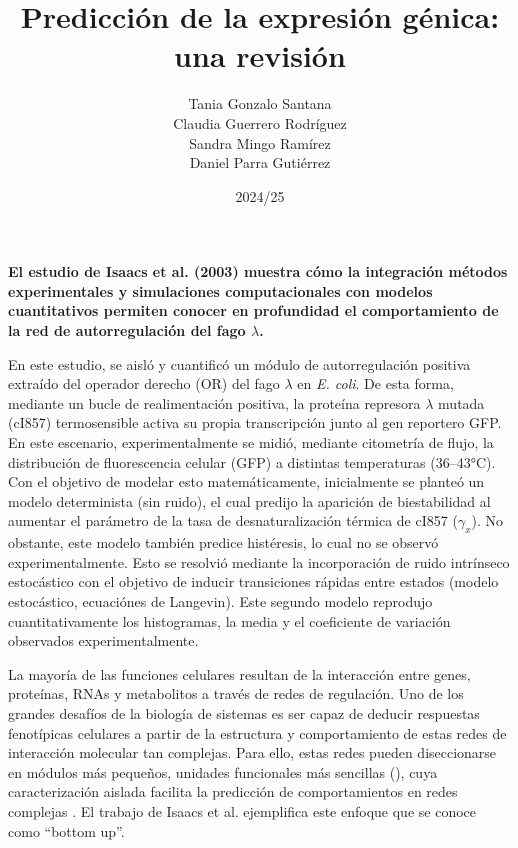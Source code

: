 \documentclass[nochap]{config/ejercicios}
\title{Predicción de la expresión génica: una revisión}
\author{Tania Gonzalo Santana \\ Claudia Guerrero Rodríguez \\ Sandra Mingo Ramírez \\ Daniel Parra Gutiérrez }
\date{2024/25}
\begin{document}
\maketitle

\large
\textbf{El estudio de Isaacs et al. (2003) muestra cómo la integración métodos experimentales y simulaciones computacionales con modelos cuantitativos permiten conocer en profundidad el comportamiento de la red de autorregulación del fago $\lambda$.}
\normalsize

En este estudio, se aisló y cuantificó un módulo de autorregulación positiva extraído del operador derecho (OR) del fago $\lambda$ en \textit{E. coli}. De esta forma, mediante un bucle de realimentación positiva, la proteína represora $\lambda$ mutada (cI857) termosensible activa su propia transcripción junto al gen reportero GFP. En este escenario, experimentalmente se midió, mediante citometría de flujo, la distribución de fluorescencia celular (GFP) a distintas temperaturas (36–43°C). Con el objetivo de modelar esto matemáticamente, inicialmente se planteó un modelo determinista (sin ruido), el cual predijo la aparición de biestabilidad al aumentar el parámetro de la tasa de desnaturalización térmica de cI857 ($\gamma_x$). No obstante, este modelo también predice histéresis, lo cual no se observó experimentalmente. Esto se resolvió mediante la incorporación de ruido intrínseco estocástico con el objetivo de inducir transiciones rápidas entre estados (modelo estocástico, ecuaciónes de Langevin). Este segundo modelo reprodujo cuantitativamente los histogramas, la media y el coeficiente de variación observados experimentalmente.

La mayoría de las funciones celulares resultan de la interacción entre genes, proteínas, RNAs y metabolitos a través de redes de regulación. Uno de los grandes desafíos de la biología de sistemas es ser capaz de deducir respuestas fenotípicas celulares a partir de la estructura y comportamiento de estas redes de interacción molecular tan complejas. Para ello, estas redes pueden diseccionarse en módulos más pequeños, unidades funcionales más sencillas (\cite{Hartwell1999}), cuya caracterización aislada facilita la predicción de comportamientos en redes complejas \cite{Arnone1997}. El trabajo de Isaacs et al. ejemplifica este enfoque que se conoce como “bottom up”.
\end{document}
